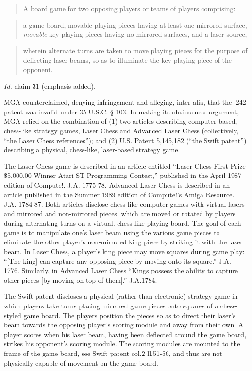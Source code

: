 \begin{quote}
A board game for two opposing players or teams of players comprising:
\end{quote}

\begin{quote}
a game board, movable playing pieces having at least one mirrored surface,
\textit{movable} key playing pieces having no mirrored surfaces, and a laser
source,
\end{quote}

\begin{quote}
wherein alternate turns are taken to move playing pieces for the purpose of
deflecting laser beams, so as to illuminate the key playing piece of the
opponent.
\end{quote}

\textit{Id.} claim 31 (emphasis added).

MGA counterclaimed, denying infringement and alleging, inter alia, that the `242
patent was invalid under 35 U.S.C. {\S} 103. In making its obviousness
argument, MGA relied on the combination of (1) two articles describing
computer-based, chess-like strategy games, Laser Chess and Advanced Laser Chess
(collectively, ``the Laser Chess references''); and (2) U.S. Patent 5,145,182
(``the Swift patent'') describing a physical, chess-like, laser-based strategy
game.

The Laser Chess game is described in an article entitled ``Laser
Chess{\texttrademark} First Prize \$5,000.00 Winner Atari ST Programming
Contest,'' published in the April 1987 edition of Compute!. J.A. 1775-78.
Advanced Laser Chess is described in an article published in the Summer 1989
edition of Compute!'s Amiga Resource. J.A. 1784-87. Both articles disclose
chess-like computer games with virtual lasers and mirrored and non-mirrored
pieces, which are moved or rotated by players during alternating turns on a
virtual, chess-like playing board. The goal of each game is to manipulate one's
laser beam using the various game pieces to eliminate the other player's
non-mirrored king piece by striking it with the laser beam. In Laser Chess, a
player's king piece may move squares during game play: ``[The king] can capture
any opposing piece by moving onto its square.'' J.A. 1776. Similarly, in
Advanced Laser Chess ``Kings possess the ability to capture other pieces [by
moving on top of them].'' J.A.1784.

The Swift patent discloses a physical (rather than electronic) strategy game in
which players take turns placing mirrored game pieces onto squares of a
chess-styled game board. The players position the pieces so as to direct their
laser's beam towards the opposing player's scoring module and away from their
own. A player scores when his laser beam, having been deflected around the game
board, strikes his opponent's scoring module. The scoring modules are mounted
to the frame of the game board, see Swift patent col.2 ll.51-56, and thus are
not physically capable of movement on the game board.

